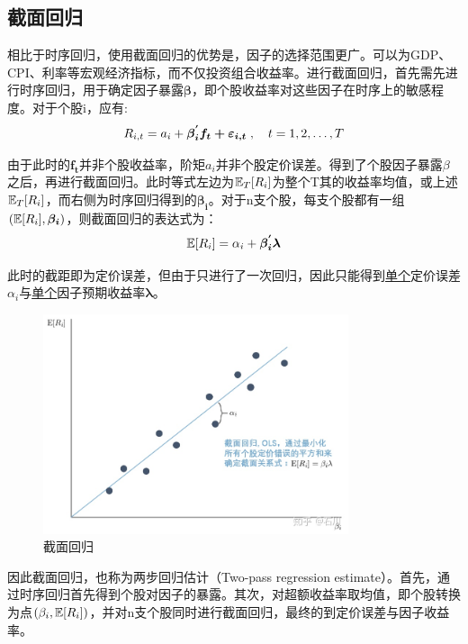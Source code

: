 \documentclass[11pt]{article}
\begin{document}
\subsection{截面回归}

相比于时序回归，使用截面回归的优势是，因子的选择范围更广。可以为GDP、CPI、利率等宏观经济指标，而不仅投资组合收益率。进行截面回归，首先需先进行时序回归，用于确定因子暴露$\bm{\beta}$，即个股收益率对这些因子在时序上的敏感程度。对于个股i，应有:
\begin{equation*}
    R_{i,t} = a_i + \bm{\beta_{i}^{'} f_t + \varepsilon_{i,t}} \;,\quad t=1,2,\dots,T
\end{equation*}

由于此时的$\bm{f_t}$并非个股收益率，阶矩$a_i$并非个股定价误差。得到了个股因子暴露$\beta$之后，再进行截面回归。此时等式左边为$\mathbb{E}_T[R_i]$为整个T其的收益率均值，或上述$\mathbb{E}_T[R_i]$，而右侧为时序回归得到的$\bm{\beta_i}$。对于n支个股，每支个股都有一组$(\mathbb{E}[R_i],\bm{\beta_i})$，则截面回归的表达式为：
\begin{equation*}
    \mathbb{E}[R_i] = \alpha_i + \bm{\beta_{i}^{'} \lambda}
\end{equation*}

此时的截距即为定价误差，但由于只进行了一次回归，因此只能得到\uline{单个}定价误差$\alpha_i$与\uline{单个}因子预期收益率$\bm{\lambda}$。

\begin{figure}[H]
    \centering
    \includegraphics[width=0.8\textwidth]{fig/cs_reg.jpg}
    \caption{截面回归}
    \label{fig：cs_reg}
\end{figure}

因此截面回归，也称为两步回归估计（Two-pass regression estimate）。首先，通过时序回归首先得到个股对因子的暴露。其次，对超额收益率取均值，即个股转换为点$(\beta_i,\mathbb{E}[R_i])$，并对n支个股同时进行截面回归，最终的到定价误差与因子收益率。
\end{document}
